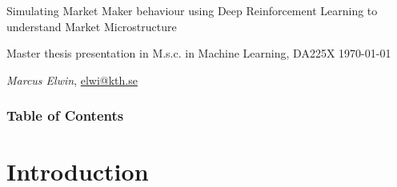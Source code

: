 \documentclass[aspectratio=1610]{beamer}
\begin{document}
\begin{frame}

  \vspace{0.02\textheight}
  
  \begin{Large}
    Simulating Market Maker behaviour using Deep Reinforcement Learning to understand Market Microstructure
  \end{Large}
  
  \begin{small}
  Master thesis presentation in M.s.c. in Machine Learning, DA225X
  \newline
  \today
  
  \end{small}
  

  \vspace{0.1\textheight}

  \begin{small}
    \textit{Marcus Elwin}, \href{mailto:elwi@kth.se}{elwi@kth.se}
  \end{small}
\end{frame}







\AtBeginSection[]

\begin{frame}
  \frametitle{\hfill Table of Contents}

  \tableofcontents[subsectionstyle=hide]

\end{frame}

\section{Introduction}
\end{document}
